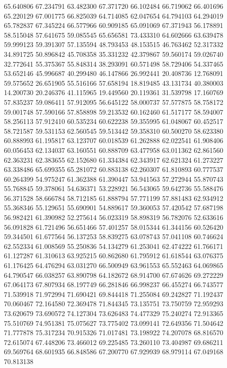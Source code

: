 65.640806
67.234791
63.482300
67.371720
66.102484
66.719062
66.401696
65.220129
67.001775
66.825039
64.714085
62.047654
64.794103
64.294019
65.782837
67.345224
66.577966
60.909185
65.091069
67.371943
56.178891
58.515048
57.641675
59.085545
65.656581
73.433310
64.602666
63.639478
59.999123
59.391307
57.135594
48.793453
48.153515
46.763462
52.317332
34.891725
50.896842
45.708358
35.331232
42.379867
59.560174
59.026740
32.772641
55.375367
55.848314
38.293091
60.571498
58.729406
54.337465
53.652146
45.996687
40.299480
46.147866
26.992441
20.408736
12.768091
59.575652
26.651905
55.516166
57.658194
18.819485
43.131734
40.380003
14.200730
20.246376
41.115965
19.449560
20.119361
31.539798
17.160769
57.835237
59.086411
57.912095
56.645122
58.000737
57.577875
58.758172
59.001748
57.590166
57.858898
59.213532
60.162460
61.517177
58.594007
58.256113
57.912410
60.535234
60.622238
59.355995
61.048067
60.452517
58.721587
59.531153
62.560545
59.513442
59.358310
60.500270
58.623380
60.888993
61.195817
63.123707
60.018539
61.262888
62.022541
61.908406
60.056453
62.134037
63.160551
60.888709
63.477958
63.011362
62.861560
62.363231
62.383655
62.152680
61.334384
62.343917
62.621324
61.273227
63.338486
65.699355
65.281072
60.883138
62.260307
61.810893
60.777537
60.264399
54.975247
61.362388
61.390447
53.941563
57.272944
55.870743
55.768845
59.378061
54.636371
53.228921
56.543065
59.642736
55.588476
56.371528
58.666784
58.712185
61.888794
57.771199
57.881483
62.934912
55.368346
55.129651
55.690901
54.889617
59.360053
57.420542
57.687198
56.982421
61.390982
52.275614
56.023319
58.898319
56.782076
52.633616
56.091828
61.721496
56.651466
57.401257
58.015344
61.344156
60.526420
59.344501
61.677564
56.137253
58.839275
63.078743
57.041108
60.746624
62.552334
61.008569
55.250836
54.134279
61.253041
62.474222
61.766171
61.127287
61.310613
63.925215
60.862680
61.795912
61.618544
63.076375
61.176425
64.476294
63.031270
66.500949
63.961553
65.552463
64.069865
64.790547
66.038257
63.890798
64.182672
68.914700
67.674626
69.272229
67.064173
67.807934
68.197749
66.281846
66.998237
66.455274
66.743577
71.539918
71.972994
71.690421
69.844418
71.255084
69.242827
71.192437
70.060467
72.164580
72.369478
71.844345
73.135751
73.750759
72.959293
73.620679
73.690572
74.127304
73.626483
74.477329
75.240274
72.913365
75.510769
74.951381
75.075627
73.775402
73.099141
72.649356
71.504642
71.777878
75.317234
70.915326
71.017481
73.198922
74.207078
68.816570
72.615074
67.448206
73.466012
69.225485
73.260110
73.404987
69.686211
69.569764
68.601935
66.848586
67.200770
67.929939
68.979114
67.049168
70.813138
